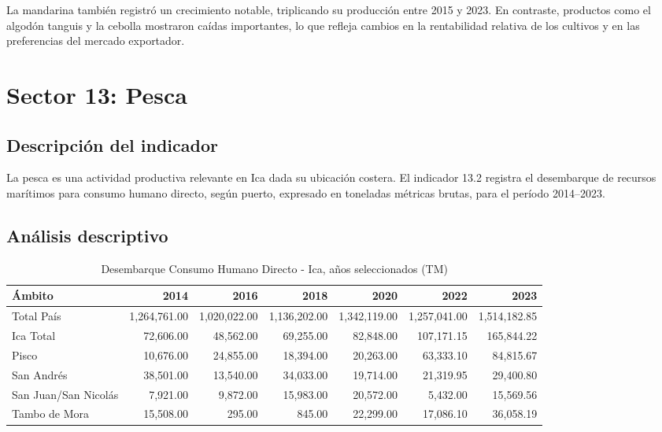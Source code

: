 \documentclass[12pt]{article}
\begin{document}
La mandarina también registró un crecimiento notable, triplicando su
producción entre 2015 y 2023. En contraste, productos como el algodón
tanguis y la cebolla mostraron caídas importantes, lo que refleja
cambios en la rentabilidad relativa de los cultivos y en las preferencias
del mercado exportador.

\section{Sector 13: Pesca}
\subsection{Descripción del indicador}
La pesca es una actividad productiva relevante en Ica dada su
ubicación costera. El indicador 13.2 registra el desembarque de
recursos marítimos para consumo humano directo, según puerto,
expresado en toneladas métricas brutas, para el período 2014--2023.

\subsection{Análisis descriptivo}

\begin{table}[H]
\centering
\caption{Desembarque Consumo Humano Directo - Ica, años seleccionados (TM)}
\small
\begin{tabular}{lrrrrrr}
\toprule
\textbf{Ámbito} & \textbf{2014} & \textbf{2016} & \textbf{2018} & \textbf{2020} & \textbf{2022} & \textbf{2023} \\
\midrule
Total País & 1,264,761.00 & 1,020,022.00 & 1,136,202.00 & 1,342,119.00 & 1,257,041.00 & 1,514,182.85 \\
Ica Total & 72,606.00 & 48,562.00 & 69,255.00 & 82,848.00 & 107,171.15 & 165,844.22 \\
Pisco & 10,676.00 & 24,855.00 & 18,394.00 & 20,263.00 & 63,333.10 & 84,815.67 \\
San Andrés & 38,501.00 & 13,540.00 & 34,033.00 & 19,714.00 & 21,319.95 & 29,400.80 \\
San Juan/San Nicolás & 7,921.00 & 9,872.00 & 15,983.00 & 20,572.00 & 5,432.00 & 15,569.56 \\
Tambo de Mora & 15,508.00 & 295.00 & 845.00 & 22,299.00 & 17,086.10 & 36,058.19 \\
\bottomrule
\end{tabular}
\end{table}
\end{document}
